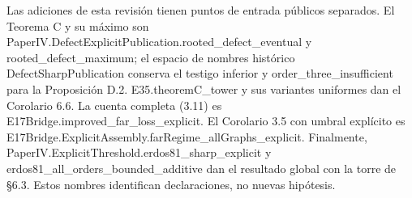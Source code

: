 \documentclass[spanish,11pt,a4paper]{article}
\begin{document}
Las adiciones de esta revisión tienen puntos de entrada públicos separados. El Teorema C y su máximo son {\ttfamily\small PaperIV.\discretionary{\hbox{\ensuremath{\hookrightarrow}}}{}{}DefectExplic\discretionary{\hbox{\ensuremath{\hookrightarrow}}}{}{}itPublicatio\discretionary{\hbox{\ensuremath{\hookrightarrow}}}{}{}n.\discretionary{\hbox{\ensuremath{\hookrightarrow}}}{}{}rooted\_\discretionary{\hbox{\ensuremath{\hookrightarrow}}}{}{}defect\_\discretionary{\hbox{\ensuremath{\hookrightarrow}}}{}{}eventual} y {\ttfamily\small rooted\_\discretionary{\hbox{\ensuremath{\hookrightarrow}}}{}{}defect\_\discretionary{\hbox{\ensuremath{\hookrightarrow}}}{}{}maximum}; el espacio de nombres histórico DefectSharpPublication conserva el testigo inferior y {\ttfamily\small order\_\discretionary{\hbox{\ensuremath{\hookrightarrow}}}{}{}three\_\discretionary{\hbox{\ensuremath{\hookrightarrow}}}{}{}insufficient} para la Proposición D.2. {\ttfamily\small E35.\discretionary{\hbox{\ensuremath{\hookrightarrow}}}{}{}theoremC\_\discretionary{\hbox{\ensuremath{\hookrightarrow}}}{}{}tower} y sus variantes uniformes dan el Corolario 6.6. La cuenta completa (3.11) es {\ttfamily\small E17Bridge.\discretionary{\hbox{\ensuremath{\hookrightarrow}}}{}{}improved\_\discretionary{\hbox{\ensuremath{\hookrightarrow}}}{}{}far\_\discretionary{\hbox{\ensuremath{\hookrightarrow}}}{}{}loss\_\discretionary{\hbox{\ensuremath{\hookrightarrow}}}{}{}explicit}. El Corolario 3.5 con umbral explícito es {\ttfamily\small E17Bridge.\discretionary{\hbox{\ensuremath{\hookrightarrow}}}{}{}ExplicitAsse\discretionary{\hbox{\ensuremath{\hookrightarrow}}}{}{}mbly.\discretionary{\hbox{\ensuremath{\hookrightarrow}}}{}{}farRegime\_\discretionary{\hbox{\ensuremath{\hookrightarrow}}}{}{}allGraphs\_\discretionary{\hbox{\ensuremath{\hookrightarrow}}}{}{}explicit}. Finalmente, {\ttfamily\small PaperIV.\discretionary{\hbox{\ensuremath{\hookrightarrow}}}{}{}ExplicitThre\discretionary{\hbox{\ensuremath{\hookrightarrow}}}{}{}shold.\discretionary{\hbox{\ensuremath{\hookrightarrow}}}{}{}erdos81\_\discretionary{\hbox{\ensuremath{\hookrightarrow}}}{}{}sharp\_\discretionary{\hbox{\ensuremath{\hookrightarrow}}}{}{}explicit} y {\ttfamily\small erdos81\_\discretionary{\hbox{\ensuremath{\hookrightarrow}}}{}{}all\_\discretionary{\hbox{\ensuremath{\hookrightarrow}}}{}{}orders\_\discretionary{\hbox{\ensuremath{\hookrightarrow}}}{}{}bounded\_\discretionary{\hbox{\ensuremath{\hookrightarrow}}}{}{}additive} dan el resultado global con la torre de §6.3. Estos nombres identifican declaraciones, no nuevas hipótesis.
\end{document}
